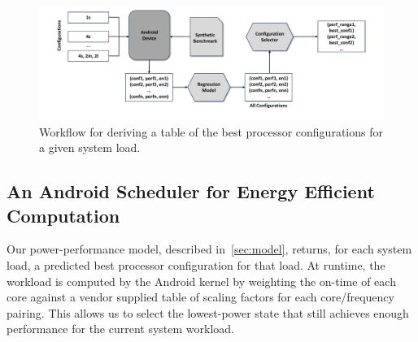 \documentclass[conference]{IEEEtran}
\begin{document}
\begin{figure}[ht]
\begin{center}
\includegraphics[scale=0.52]{ims/regression2.pdf}
\end{center}
\caption{Workflow for deriving a table of the best processor configurations for a given system load.}
\label{fig:reg2}
\end{figure}


\subsection{An Android Scheduler for Energy Efficient Computation} \label{sec:schedule}

Our power-performance model, described in~\cref{sec:model}, returns, for each system load, a predicted best processor configuration for that load. At runtime, the workload is computed by the Android kernel by weighting the on-time of each core against a vendor supplied table of scaling factors for each core/frequency pairing. This allows us to select the lowest-power state that still achieves enough performance for the current system workload.
\end{document}
